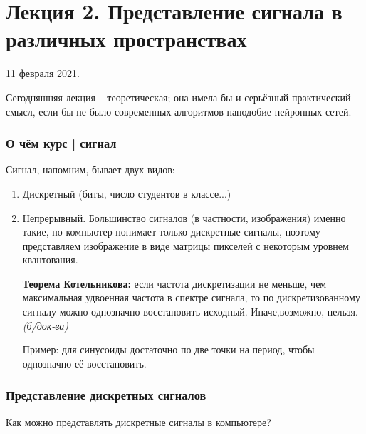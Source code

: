 \documentclass[main.tex]{subfiles}
\begin{document}
	
\section{Лекция 2. Представление сигнала в различных пространствах}
	
11 февраля 2021.

Сегодняшняя лекция -- теоретическая; она имела бы и серьёзный практический смысл, если бы не было современных алгоритмов наподобие нейронных сетей.

\subsubsection{О чём курс | сигнал}

Сигнал, напомним, бывает двух видов:

\begin{enumerate}[noitemsep]
	\item Дискретный (биты, число студентов в классе...)
	\item Непрерывный. Большинство сигналов (в частности, изображения) именно такие, но компьютер понимает только дискретные сигналы, поэтому представляем изображение в виде матрицы пикселей с некоторым уровнем квантования.
	
	\textbf{Теорема Котельникова:} если частота дискретизации не меньше, чем максимальная удвоенная частота в спектре сигнала, то по дискретизованному сигналу можно однозначно восстановить исходный.
	Иначе,возможно, нельзя.
	\emph{(б/док-ва)}
	
	Пример: для синусоиды достаточно по две точки на период, чтобы однозначно её восстановить.
\end{enumerate}

\subsubsection{Представление дискретных сигналов}

Как можно представлять дискретные сигналы в компьютере?
\end{document}

